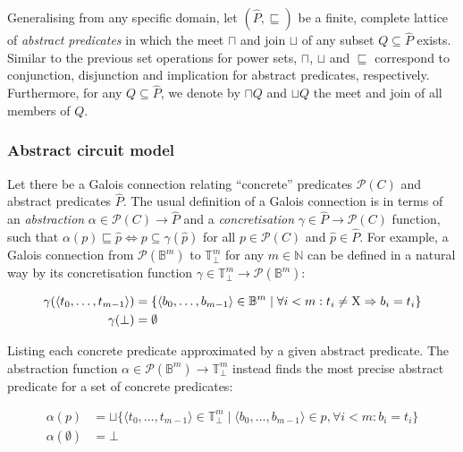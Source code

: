 Generalising from any specific domain, let $(\hat P,\sqsubseteq)$ be a finite, complete lattice of \textit{abstract predicates} in which the meet $\sqcap$ and join $\sqcup$ of any subset $Q \subseteq \hat P$ exists. Similar to the previous set operations for power sets, $\sqcap$, $\sqcup$ and $\sqsubseteq$ correspond to conjunction, disjunction and implication for abstract predicates, respectively. Furthermore, for any $Q \subseteq \hat P$, we denote by $\sqcap Q$ and $\sqcup Q$ the meet and join of all members of $Q$.

\subsubsection{Abstract circuit model}

Let there be a Galois connection relating ``concrete'' predicates $\mathcal{P}(C)$ and abstract predicates $\hat P$. The usual definition of a Galois connection is in terms of an \textit{abstraction} $\alpha \in \mathcal{P}(C) \rightarrow \hat P$ and a \textit{concretisation} $\gamma \in \hat P \rightarrow \mathcal{P}(C)$ function, such that $\alpha(p) \sqsubseteq \hat p \iff p \subseteq \gamma(\hat p)$ for all $p \in \mathcal{P}(C)$ and $\hat p \in \hat P$. For example, a Galois connection from $\mathcal{P}(\mathbb{B}^{m})$ to $\mathbb{T}_{\bot}^{m}$ for any $m \in \mathbb{N}$ can be defined in a natural way by its concretisation function $\gamma \in \mathbb{T}_{\bot}^{m} \rightarrow \mathcal{P}(\mathbb{B}^{m})$:

\begin{align*}
\gamma ( \langle t_{0}, \dots,t_{m-1} \rangle ) &= \{ \langle b_{0}, \dots,b_{m-1} \rangle \in \mathbb{B}^{m} \mid \forall i < m : t_{i} \neq \mathrm{X} \Rightarrow b_{i} = t_{i} \} \\
\gamma ( \bot ) &= \emptyset
\end{align*}

\noindent Listing each concrete predicate approximated by a given abstract predicate. The abstraction function $\alpha \in \mathcal{P}(\mathbb{B}^{m}) \rightarrow \mathbb{T}_{\bot}^{m}$ instead finds the most precise abstract predicate for a set of concrete predicates:

\begin{align*}
\alpha ( p ) &= \sqcup \{ \langle t_{0}, \ldots, t_{m-1} \rangle \in \mathbb{T}_{\bot}^{m} \mid \langle b_{0}, \ldots, b_{m-1} \rangle \in p, \forall i < m : b_{i} = t_{i} \} \\
\alpha ( \emptyset ) &= \bot
\end{align*}

